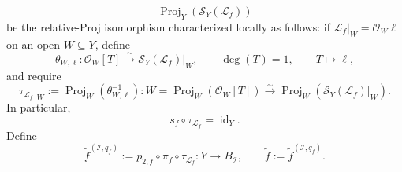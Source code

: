 \begin{definition}
\[      \operatorname{Proj}_Y(\mathcal S_Y(\mathcal L_f))
  \]
  be the relative-Proj isomorphism characterized locally as follows: if
  $\mathcal L_f|_W=\mathcal O_W\ell$ on an open $W\subseteq Y$, define
  \[
    \theta_{W,\ell}\colon\mathcal O_W[T]\xrightarrow{\sim}
      \mathcal S_Y(\mathcal L_f)|_W,
    \qquad \deg(T)=1,\qquad T\longmapsto\ell,
  \]
  and require
  \[
    \tau_{\mathcal L_f}|_W
      :=\operatorname{Proj}_W(\theta_{W,\ell}^{-1})
      \colon W=\operatorname{Proj}_W(\mathcal O_W[T])
      \xrightarrow{\sim}
      \operatorname{Proj}_W(\mathcal S_Y(\mathcal L_f)|_W).
  \]
  In particular,
  \[
    s_f\circ\tau_{\mathcal L_f}=\operatorname{id}_Y.          \tag{UL4}
  \]
  Define
  \[
    \widetilde f^{(\mathcal I,q_f)}
      :=p_{2,f}\circ\pi_f\circ\tau_{\mathcal L_f}
      \colon Y\longrightarrow B_{\mathcal I},\qquad
    \widetilde f:=\widetilde f^{(\mathcal I,q_f)}.            \tag{UL5}
  \]
\end{definition}

